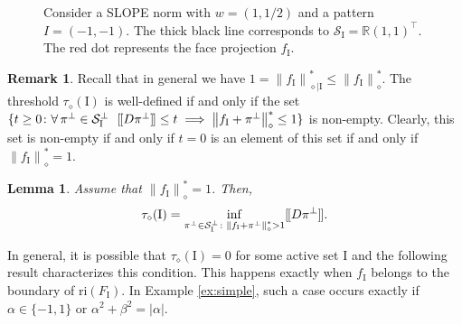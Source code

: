 \documentclass[12pt]{amsart}
\numberwithin{equation}{section}
\numberwithin{equation}{section}
\newtheorem{lemma}[thm]{Lemma}
\theoremstyle{definition}
\newtheorem{remark}[thm]{Remark}
\newcommand{\R}{\mathbb{R}}
\newcommand{\I}{\mathrm{I}}
\newcommand{\polyd}[1]{\left\|#1\right\|^\ast_\diamond}
\newcommand{\polydr}[2]{\left\|#1\right\|^\ast_{\diamond\mid #2}}
\newcommand{\PP}{\mathrm{P}}
\renewcommand{\SS}{\mathcal{S}}
\newcommand{\cnorm}[1]{[\mkern-1.5mu[#1]\mkern-1.5mu]}
\begin{document}
\begin{figure}[htbp]
    \centering
            \caption{Consider a SLOPE norm with $w=(1,1/2)$ and a pattern $I=(-1,-1)$.
            The thick black line corresponds to $\mathcal{S}_\I = \R(1,1)^\top$.
            The red dot represents the face projection $f_\I$.}\label{fig:tau}
\end{figure}




\begin{remark}\label{rem:tau_does_not_exist}
Recall that in general we have $1=\polydr{f_\I}{\I} \leq \polyd{f_\I}$.
The threshold $\tau_\diamond(\I)$ is well-defined if and only if the set $\{t\geq0\colon \forall\,\pi^\bot\in\SS_{\I}^\bot\,\,\,\, \cnorm{D\pi^\bot}\leq t\implies \polyd{f_{\I}+\pi^\bot}\leq 1\}$ is non-empty. Clearly, this set is non-empty if and only if $t=0$ is an element of this set if and only if $\polyd{f_\I}= 1$. 
\end{remark}

\begin{lemma}\label{lem:tau}
Assume that $\polyd{f_\I}=1$. Then,
\[
\tau_\diamond(\I)=  \inf_{\pi^\bot\in\SS_\I^\bot\colon \polyd{f_\I+\pi^\bot}> 1}\cnorm{D\pi^\bot}.
\]
\end{lemma}


In general, it is possible that $\tau_\diamond(\I)=0$ for some active set $\I$ and the following result characterizes this condition. This happens exactly when $f_\I$ belongs to the boundary of $\mathrm{ri}(F_\I)$. In Example \ref{ex:simple}, such a case occurs exactly if $\alpha\in\{-1,1\}$ or $\alpha^2+\beta^2=|\alpha|$.
\end{document}
